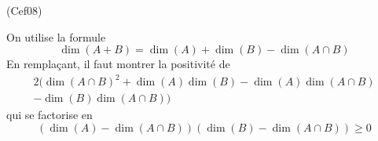 \begin{tiny}(Cef08)\end{tiny} On utilise la formule
\begin{displaymath}
\dim(A+B) = \dim(A) + \dim(B) - \dim(A\cap B)
\end{displaymath}
En remplaçant, il faut montrer la positivité de
\begin{multline*}
2( \dim(A\cap B)^2 + \dim(A)\dim(B) - \dim(A)\dim(A\cap B) \\ - \dim(B)\dim(A\cap B) )   
\end{multline*}
qui se factorise en
\begin{displaymath}
 (\dim(A) - \dim(A\cap B))(\dim(B) - \dim(A\cap B))\geq 0 
\end{displaymath}
